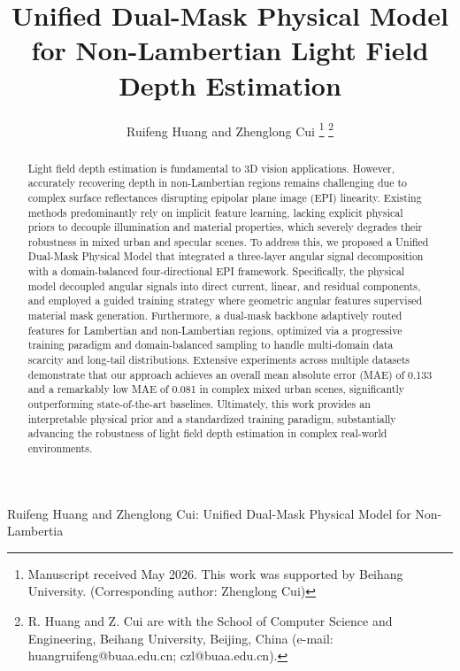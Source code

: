 \documentclass[lettersize,journal]{IEEEtran}
\begin{document}
\title{Unified Dual-Mask Physical Model for Non-Lambertian Light Field Depth Estimation}

\author{Ruifeng Huang and Zhenglong Cui
\thanks{Manuscript received May 2026. This work was supported by Beihang University. (Corresponding author: Zhenglong Cui)}
\thanks{R. Huang and Z. Cui are with the School of Computer Science and Engineering, Beihang University, Beijing, China (e-mail: huangruifeng@buaa.edu.cn; czl@buaa.edu.cn).}}

%
{Ruifeng Huang and Zhenglong Cui: Unified Dual-Mask Physical Model for Non-Lambertia}

\maketitle

\begin{abstract}
Light field depth estimation is fundamental to 3D vision applications. However, accurately recovering depth in non-Lambertian regions remains challenging due to complex surface reflectances disrupting epipolar plane image (EPI) linearity. Existing methods predominantly rely on implicit feature learning, lacking explicit physical priors to decouple illumination and material properties, which severely degrades their robustness in mixed urban and specular scenes. To address this, we proposed a Unified Dual-Mask Physical Model that integrated a three-layer angular signal decomposition with a domain-balanced four-directional EPI framework. Specifically, the physical model decoupled angular signals into direct current, linear, and residual components, and employed a guided training strategy where geometric angular features supervised material mask generation. Furthermore, a dual-mask backbone adaptively routed features for Lambertian and non-Lambertian regions, optimized via a progressive training paradigm and domain-balanced sampling to handle multi-domain data scarcity and long-tail distributions. Extensive experiments across multiple datasets demonstrate that our approach achieves an overall mean absolute error (MAE) of 0.133 and a remarkably low MAE of 0.081 in complex mixed urban scenes, significantly outperforming state-of-the-art baselines. Ultimately, this work provides an interpretable physical prior and a standardized training paradigm, substantially advancing the robustness of light field depth estimation in complex real-world environments.
\end{abstract}
\end{document}

